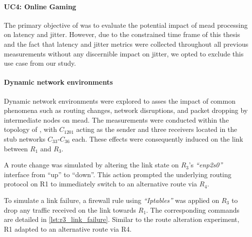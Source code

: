 \paragraph{UC4: Online Gaming} %
\label{par:UC4}
The primary objective of \uciv{} was to evaluate the potential impact of \gls{mead}
    processing on latency and jitter.
However, due to the constrained time frame of this thesis and the fact that 
    latency and jitter metrics were collected throughout all previous
    measurements without any discernible impact on jitter, we opted to exclude
    this use case from our study.

\paragraph{Dynamic network environments} %
\label{par:Dynamic network environments}
Dynamic network environments were explored to asses the impact of common
    phenomena such as routing changes, network disruptions, and packet dropping
    by intermediate nodes on \gls{mead}.
The measurements were conducted within the topology of \uciii{}, with
    $C_{1201}$ acting as the sender and three receivers located in the stub
    networks $C_{33}$-$C_{36}$ each.
These effects were consequently induced on the link between $R_1$ and $R_3$.

A route change was simulated by altering the link state on $R_3$'s
    \textit{``enp2s0''} interface from ``up'' to ``down''.
This action prompted the underlying routing protocol on R1 to immediately
    switch to an alternative route via $R_4$.

To simulate a link failure, a firewall rule using \textit{``Iptables''} was
    applied on $R_3$ to drop any traffic received on the link towards $R_1$.
The corresponding commands are detailed in \autoref{lst:r3_link_failure}.
Similar to the route alteration experiment, R1 adapted to an alternative route
    via R4.

